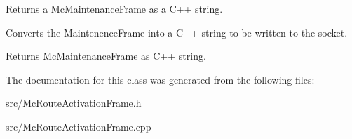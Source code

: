 Returns a Mc\-Maintenance\-Frame as a C++ string. 

Converts the Maintenence\-Frame into a C++ string to be written to the socket. \begin{DoxyReturn}{Returns}
Mc\-Maintenance\-Frame as C++ string. 
\end{DoxyReturn}


The documentation for this class was generated from the following files\-:\begin{DoxyCompactItemize}
\item 
src/Mc\-Route\-Activation\-Frame.\-h\item 
src/Mc\-Route\-Activation\-Frame.\-cpp\end{DoxyCompactItemize}
